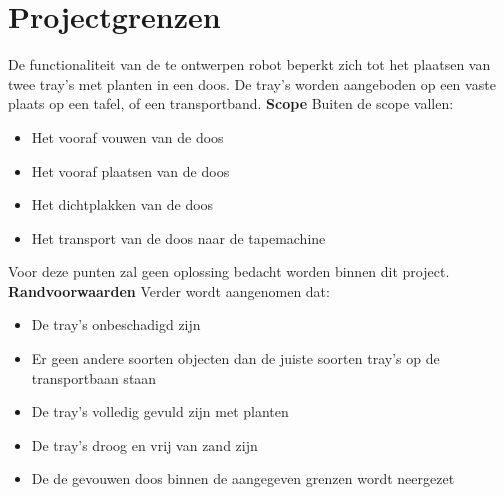 
\section{Projectgrenzen}
De functionaliteit van de te ontwerpen robot beperkt zich tot het plaatsen van twee tray's met planten in een doos. De tray's worden aangeboden op een vaste plaats op een tafel, of een transportband. 
\newline
\newline
\textbf{Scope}
\newline
Buiten de scope vallen:
\begin{itemize}
    \item Het vooraf vouwen van de doos
    \item Het vooraf plaatsen van de doos
    \item Het dichtplakken van de doos
    \item Het transport van de doos naar de tapemachine
\end{itemize}
Voor deze punten zal geen oplossing bedacht worden binnen dit project.
\newline
\newline
\textbf{Randvoorwaarden}
\newline
Verder wordt aangenomen dat:
\begin{itemize}
	\item De tray's onbeschadigd zijn
	\item Er geen andere soorten objecten dan de juiste soorten tray's op de transportbaan staan
	\item De tray's volledig gevuld zijn met planten
	\item De tray's droog en vrij van zand zijn
	\item De de gevouwen doos binnen de aangegeven grenzen wordt neergezet
\end{itemize}



